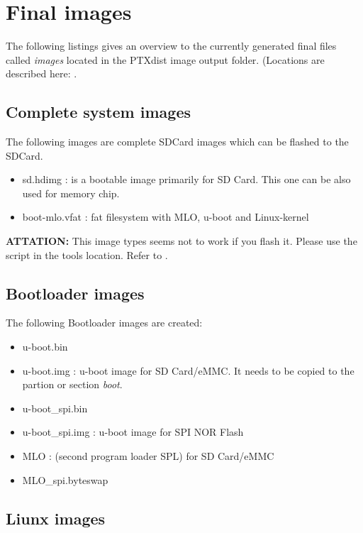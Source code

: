 \chapter{Final images}%
\label{cha:Final images}
The following listings gives an overview to the currently generated final files
called \textit{images} located in the PTXdist image output folder. (Locations
are described here: .
\pageref{chp:einleitung}

\section{Complete system images}%
The following images are complete SDCard images which can be flashed to the
SDCard.
\label{sec:compleate system images}

\begin{itemize}
    \item sd.hdimg : is a bootable image primarily for SD Card.
        This one can be also used for memory chip.
    \item boot-mlo.vfat : fat filesystem with MLO, u-boot and Linux-kernel
\end{itemize}

\textbf{ATTATION:} This image types seems not to work if you flash it. Please
use the script in the tools location. Refer to .

\section{Bootloader images}%
\label{sec:Bootloader images}

The following Bootloader images are created:

\begin{itemize}
    \item u-boot.bin
    \item u-boot.img : u-boot image for SD Card/eMMC. It needs to be copied to
        the partion or section \textit{boot}.
    \item u-boot\_spi.bin
    \item u-boot\_spi.img : u-boot image for SPI NOR Flash
    \item MLO : (second program loader SPL) for SD Card/eMMC
    \item MLO\_spi.byteswap
\end{itemize}


\section{Liunx images}%
\label{sec:Liunx images}

